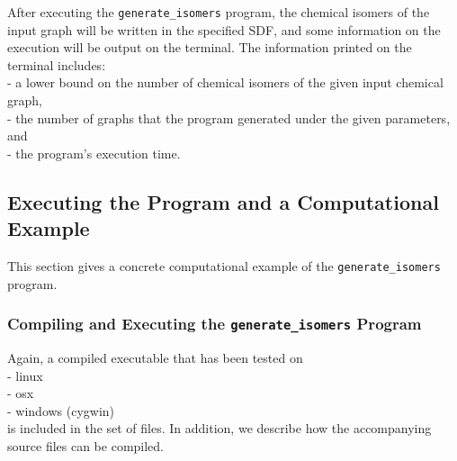 \documentclass[11pt,titlepage,dvipdfmx,twoside]{book}
\begin{document}
After executing the {\tt generate\_isomers} program,
the chemical isomers of the input graph will be written
in the specified SDF, and some information on the execution will be output on 
the terminal.
The information printed on the terminal includes:\\
 - a lower bound on the number of chemical isomers of the given input chemical graph, \\
 - the number of graphs that the program generated under the given parameters, and \\
 - the program's execution time.
 


\subsection{Executing the Program and a Computational Example}
\label{chap:Example_m}

This section gives a concrete computational example of the {\tt generate\_isomers} program.


\subsubsection{Compiling and Executing the {\tt generate\_isomers} Program}
\label{chap:compile_m}

Again, a compiled executable that has been tested on \\
- linux \\
- osx \\
- windows (cygwin) \\
is included in the set of files.
In addition, we describe how the accompanying source files can be compiled.
\end{document}
